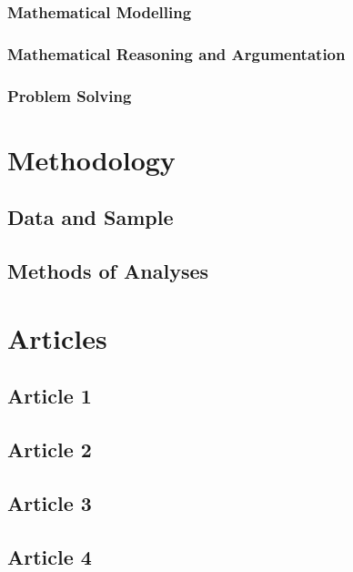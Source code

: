 \documentclass[
    a4paper,                %
    11pt,                   %
    stu,                    %
    donotrepeattitle,       %
    floatsintext,           %
    biblatex,               %
    colorlinks=true,        %
    linkcolor=red,          %
    anchorcolor=black,      %
    citecolor=blue,         %
    urlcolor=blue,          %
    bookmarks=true,         %
    bookmarksopen=false,    %
    bookmarksnumbered=true, %
    dvipsnames              %
]{apa7}
\begin{document}
\subsubsection{Mathematical Modelling}

\subsubsection{Mathematical Reasoning and Argumentation}

\subsubsection{Problem Solving}

\section{Methodology}

\subsection{Data and Sample}

\subsection{Methods of Analyses}

\section{Articles}

\subsection{Article 1}

\subsection{Article 2}

\subsection{Article 3}

\subsection{Article 4}
\end{document}
